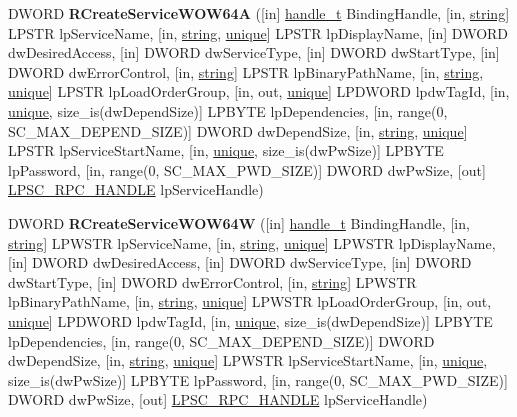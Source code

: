 \begin{DoxyCompactItemize}
D\+W\+O\+RD {\bfseries R\+Create\+Service\+W\+O\+W64A} (\mbox{[}in\mbox{]} \hyperlink{interfacevoid}{handle\+\_\+t} Binding\+Handle, \mbox{[}in, \hyperlink{structstring}{string}\mbox{]} L\+P\+S\+TR lp\+Service\+Name, \mbox{[}in, \hyperlink{structstring}{string}, \hyperlink{interfaceunique}{unique}\mbox{]} L\+P\+S\+TR lp\+Display\+Name, \mbox{[}in\mbox{]} D\+W\+O\+RD dw\+Desired\+Access, \mbox{[}in\mbox{]} D\+W\+O\+RD dw\+Service\+Type, \mbox{[}in\mbox{]} D\+W\+O\+RD dw\+Start\+Type, \mbox{[}in\mbox{]} D\+W\+O\+RD dw\+Error\+Control, \mbox{[}in, \hyperlink{structstring}{string}\mbox{]} L\+P\+S\+TR lp\+Binary\+Path\+Name, \mbox{[}in, \hyperlink{structstring}{string}, \hyperlink{interfaceunique}{unique}\mbox{]} L\+P\+S\+TR lp\+Load\+Order\+Group, \mbox{[}in, out, \hyperlink{interfaceunique}{unique}\mbox{]} L\+P\+D\+W\+O\+RD lpdw\+Tag\+Id, \mbox{[}in, \hyperlink{interfaceunique}{unique}, size\+\_\+is(dw\+Depend\+Size)\mbox{]} L\+P\+B\+Y\+TE lp\+Dependencies, \mbox{[}in, range(0, S\+C\+\_\+\+M\+A\+X\+\_\+\+D\+E\+P\+E\+N\+D\+\_\+\+S\+I\+ZE)\mbox{]} D\+W\+O\+RD dw\+Depend\+Size, \mbox{[}in, \hyperlink{structstring}{string}, \hyperlink{interfaceunique}{unique}\mbox{]} L\+P\+S\+TR lp\+Service\+Start\+Name, \mbox{[}in, \hyperlink{interfaceunique}{unique}, size\+\_\+is(dw\+Pw\+Size)\mbox{]} L\+P\+B\+Y\+TE lp\+Password, \mbox{[}in, range(0, S\+C\+\_\+\+M\+A\+X\+\_\+\+P\+W\+D\+\_\+\+S\+I\+ZE)\mbox{]} D\+W\+O\+RD dw\+Pw\+Size, \mbox{[}out\mbox{]} \hyperlink{interfacevoid}{L\+P\+S\+C\+\_\+\+R\+P\+C\+\_\+\+H\+A\+N\+D\+LE} lp\+Service\+Handle)
\item 
\mbox{\label{interfacesvcctl_af86b25d492e15c289abe4a6a75e738a4}} 
D\+W\+O\+RD {\bfseries R\+Create\+Service\+W\+O\+W64W} (\mbox{[}in\mbox{]} \hyperlink{interfacevoid}{handle\+\_\+t} Binding\+Handle, \mbox{[}in, \hyperlink{structstring}{string}\mbox{]} L\+P\+W\+S\+TR lp\+Service\+Name, \mbox{[}in, \hyperlink{structstring}{string}, \hyperlink{interfaceunique}{unique}\mbox{]} L\+P\+W\+S\+TR lp\+Display\+Name, \mbox{[}in\mbox{]} D\+W\+O\+RD dw\+Desired\+Access, \mbox{[}in\mbox{]} D\+W\+O\+RD dw\+Service\+Type, \mbox{[}in\mbox{]} D\+W\+O\+RD dw\+Start\+Type, \mbox{[}in\mbox{]} D\+W\+O\+RD dw\+Error\+Control, \mbox{[}in, \hyperlink{structstring}{string}\mbox{]} L\+P\+W\+S\+TR lp\+Binary\+Path\+Name, \mbox{[}in, \hyperlink{structstring}{string}, \hyperlink{interfaceunique}{unique}\mbox{]} L\+P\+W\+S\+TR lp\+Load\+Order\+Group, \mbox{[}in, out, \hyperlink{interfaceunique}{unique}\mbox{]} L\+P\+D\+W\+O\+RD lpdw\+Tag\+Id, \mbox{[}in, \hyperlink{interfaceunique}{unique}, size\+\_\+is(dw\+Depend\+Size)\mbox{]} L\+P\+B\+Y\+TE lp\+Dependencies, \mbox{[}in, range(0, S\+C\+\_\+\+M\+A\+X\+\_\+\+D\+E\+P\+E\+N\+D\+\_\+\+S\+I\+ZE)\mbox{]} D\+W\+O\+RD dw\+Depend\+Size, \mbox{[}in, \hyperlink{structstring}{string}, \hyperlink{interfaceunique}{unique}\mbox{]} L\+P\+W\+S\+TR lp\+Service\+Start\+Name, \mbox{[}in, \hyperlink{interfaceunique}{unique}, size\+\_\+is(dw\+Pw\+Size)\mbox{]} L\+P\+B\+Y\+TE lp\+Password, \mbox{[}in, range(0, S\+C\+\_\+\+M\+A\+X\+\_\+\+P\+W\+D\+\_\+\+S\+I\+ZE)\mbox{]} D\+W\+O\+RD dw\+Pw\+Size, \mbox{[}out\mbox{]} \hyperlink{interfacevoid}{L\+P\+S\+C\+\_\+\+R\+P\+C\+\_\+\+H\+A\+N\+D\+LE} lp\+Service\+Handle)

\end{DoxyCompactItemize}
